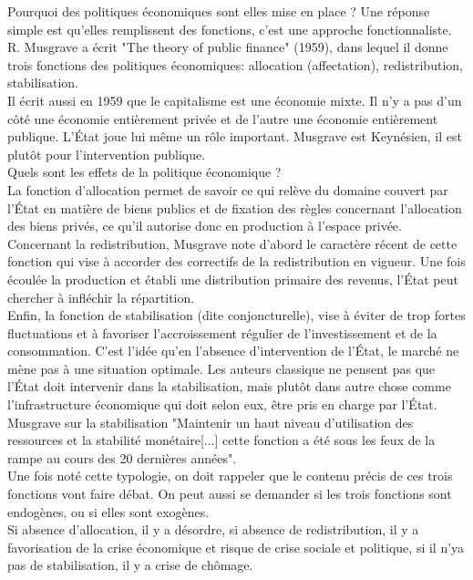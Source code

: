 \documentclass[10pt, a4paper, openany]{book}
\begin{document}
Pourquoi des politiques économiques sont elles mise en place ? Une réponse simple est qu'elles remplissent des fonctions, c'est une approche fonctionnaliste. R. Musgrave a écrit "The theory of public finance" (1959), dans lequel il donne trois fonctions des politiques économiques: allocation (affectation), redistribution, stabilisation. \\
Il écrit aussi en 1959 que le capitalisme est une économie mixte. Il n'y a pas d'un côté une économie entièrement privée et de l'autre une économie entièrement publique. L'État joue lui même un rôle important. Musgrave est Keynésien, il est plutôt pour l'intervention publique. \\
Quels sont les effets de la politique économique ? \\
La fonction d'allocation permet de savoir ce qui relève du domaine couvert par l'État en matière de biens publics et de fixation des règles concernant l'allocation des biens privés, ce qu'il autorise donc en production à l'espace privée. \\
Concernant la redistribution, Musgrave note d'abord le caractère récent de cette fonction qui vise à accorder des correctifs de la redistribution en vigueur. Une fois écoulée la production et établi une distribution primaire des revenus, l'État peut chercher à infléchir la répartition. \\
Enfin, la fonction de stabilisation (dite conjoncturelle), vise à éviter de trop fortes fluctuations et à favoriser l'accroissement régulier de l'investissement et de la consommation. C'est l'idée qu'en l'absence d'intervention de l'État, le marché ne mène pas à une situation optimale. Les auteurs classique ne pensent pas que l'État doit intervenir dans la stabilisation, mais plutôt dans autre chose comme l'infrastructure économique qui doit selon eux, être pris en charge par l'État. Musgrave sur la stabilisation "Maintenir un haut niveau d'utilisation des ressources et la stabilité monétaire[...] cette fonction a été sous les feux de la rampe au cours des 20 dernières années". \\
Une fois noté cette typologie, on doit rappeler que le contenu précis de ces trois fonctions vont faire débat. On peut aussi se demander si les trois fonctions sont endogènes, ou si elles sont exogènes. \\
Si absence d'allocation, il y a désordre, si absence de redistribution, il y a favorisation de la crise économique et risque de crise sociale et politique, si il n'ya pas de stabilisation, il y a crise de chômage. 
\end{document}

